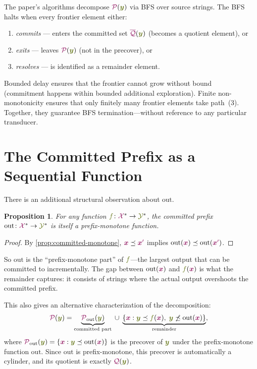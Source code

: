 \documentclass{article}
\newcommand{\preCover}{{\color{TokenColor}\mathcal{P}}}
\newcommand{\maxQuotient}{{\color{TokenColor}\overline{\mathcal{Q}}}}
\newcommand{\Quotient}{{\color{TokenColor}\mathcal{Q}}}
\newcommand{\transFnSym}[0]{f}
\newcommand{\transFn}{\ensuremath{{\color{CharacterColor}\transFnSym}}\xspace}
\newcommand{\srcStr}{\ensuremath{{\color{TokenColor}\boldsymbol{x}}}\xspace}
\newcommand{\srcStrp}{\ensuremath{{\color{TokenColor}\boldsymbol{x}^\prime}}\xspace}
\newcommand{\tgtStr}{{\color{CharacterColor}\boldsymbol{y}}}
\newcommand{\srcAlphabet}[0]{{\color{TokenColor}\ensuremath{\mathcal{X}}}\xspace}
\newcommand{\tgtAlphabet}[0]{{\color{CharacterColor}\ensuremath{\mathcal{Y}}}\xspace}
\newcommand{\srcStrings}[0]{\ensuremath{\srcAlphabet^*}\xspace}
\newcommand{\tgtStrings}[0]{\ensuremath{\tgtAlphabet^*}\xspace}
\newcommand{\committed}{\mathrm{out}}
\theoremstyle{plain}
\newtheorem{proposition}[theorem]{Proposition}
\theoremstyle{definition}
\theoremstyle{remark}
\begin{document}
The paper's algorithms decompose $\preCover(\tgtStr)$ via BFS over source
strings.  The BFS halts when every frontier element either:
\begin{enumerate}
\item \emph{commits} --- enters the committed set $\maxQuotient(\tgtStr)$
  (becomes a quotient element), or
\item \emph{exits} --- leaves $\preCover(\tgtStr)$ (not in the precover), or
\item \emph{resolves} --- is identified as a remainder element.
\end{enumerate}
Bounded delay ensures that the frontier cannot grow without bound (commitment
happens within bounded additional exploration).  Finite non-monotonicity ensures
that only finitely many frontier elements take path~(3).  Together, they
guarantee BFS termination---without reference to any particular transducer.


\section{The Committed Prefix as a Sequential Function}
\label{sec:sequential}

There is an additional structural observation about $\committed$.

\begin{proposition}
\label{prop:committed-sequential}
For any function $\transFn \colon \srcStrings \to \tgtStrings$, the committed
prefix $\committed \colon \srcStrings \to \tgtStrings$ is itself a
prefix-monotone function.
\end{proposition}
\begin{proof}
By \cref{prop:committed-monotone}, $\srcStr \preceq \srcStrp$ implies
$\committed(\srcStr) \preceq \committed(\srcStrp)$.
\end{proof}

So $\committed$ is the ``prefix-monotone part'' of $\transFn$---the largest
output that can be committed to incrementally.  The gap between
$\committed(\srcStr)$ and $\transFn(\srcStr)$ is what the remainder captures:
it consists of strings where the actual output overshoots the committed prefix.

This also gives an alternative characterization of the decomposition:
\begin{equation}
  \preCover(\tgtStr) = \underbrace{\preCover_{\committed}(\tgtStr)}_{\text{committed part}}
  \;\cup\;
  \underbrace{\{\srcStr : \tgtStr \preceq \transFn(\srcStr),\;
    \tgtStr \not\preceq \committed(\srcStr)\}}_{\text{remainder}},
\end{equation}
where $\preCover_{\committed}(\tgtStr) = \{\srcStr : \tgtStr \preceq
\committed(\srcStr)\}$ is the precover of $\tgtStr$ under the prefix-monotone
function $\committed$.  Since $\committed$ is prefix-monotone, this precover
is automatically a cylinder, and its quotient is exactly $\Quotient(\tgtStr)$.
\end{document}
